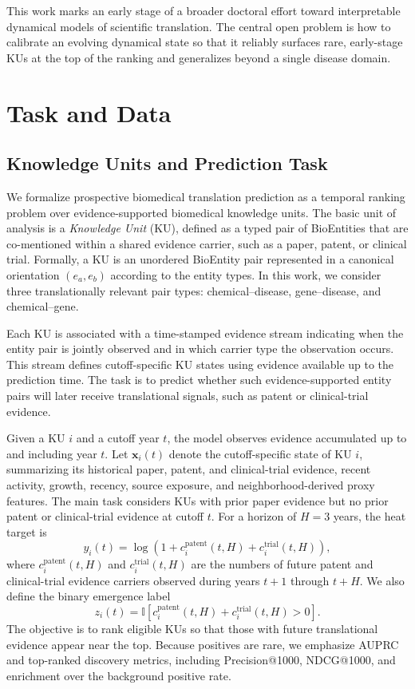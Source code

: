 \documentclass[conference]{IEEEtran}
\begin{document}
This work marks an early stage of a broader doctoral effort toward interpretable dynamical models of scientific translation. The central open problem is how to calibrate an evolving dynamical state so that it reliably surfaces rare, early-stage KUs at the top of the ranking and generalizes beyond a single disease domain.

\section{Task and Data}

\subsection{Knowledge Units and Prediction Task}

We formalize prospective biomedical translation prediction as a temporal ranking problem over evidence-supported biomedical knowledge units. The basic unit of analysis is a \emph{Knowledge Unit} (KU), defined as a typed pair of BioEntities that are co-mentioned within a shared evidence carrier, such as a paper, patent, or clinical trial. Formally, a KU is an unordered BioEntity pair represented in a canonical orientation $(e_a, e_b)$ according to the entity types. In this work, we consider three translationally relevant pair types: chemical--disease, gene--disease, and chemical--gene.

Each KU is associated with a time-stamped evidence stream indicating when the entity pair is jointly observed and in which carrier type the observation occurs. This stream defines cutoff-specific KU states using evidence available up to the prediction time. The task is to predict whether such evidence-supported entity pairs will later receive translational signals, such as patent or clinical-trial evidence.

Given a KU $i$ and a cutoff year $t$, the model observes evidence accumulated up to and including year $t$. Let $\mathbf{x}_i(t)$ denote the cutoff-specific state of KU $i$, summarizing its historical paper, patent, and clinical-trial evidence, recent activity, growth, recency, source exposure, and neighborhood-derived proxy features. The main task considers KUs with prior paper evidence but no prior patent or clinical-trial evidence at cutoff $t$. For a horizon of $H=3$ years, the heat target is
\begin{equation}
y_i(t)=\log\left(1+c_i^{\mathrm{patent}}(t,H)+c_i^{\mathrm{trial}}(t,H)\right),
\end{equation}
where $c_i^{\mathrm{patent}}(t,H)$ and $c_i^{\mathrm{trial}}(t,H)$ are the numbers of future patent and clinical-trial evidence carriers observed during years $t+1$ through $t+H$. We also define the binary emergence label
\begin{equation}
z_i(t)=\mathbb{I}\left[c_i^{\mathrm{patent}}(t,H)+c_i^{\mathrm{trial}}(t,H)>0\right].
\end{equation}
The objective is to rank eligible KUs so that those with future translational evidence appear near the top. Because positives are rare, we emphasize AUPRC and top-ranked discovery metrics, including Precision@1000, NDCG@1000, and enrichment over the background positive rate.
\end{document}
